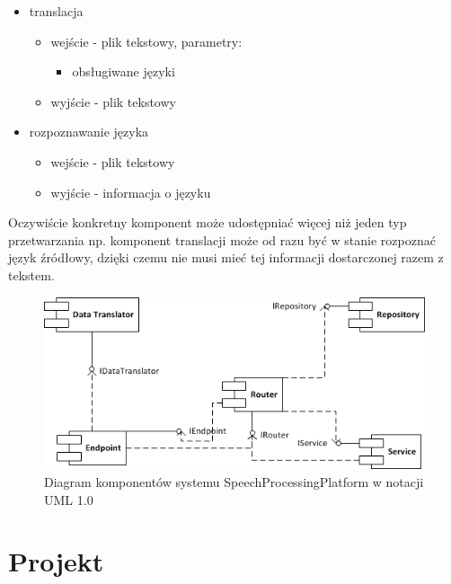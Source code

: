\begin{itemize}
	\item translacja
	\begin{itemize}
		\item wejście - plik tekstowy, parametry:
		\begin{itemize}
			\item obsługiwane języki 
		\end{itemize}
		\item wyjście - plik tekstowy
	\end{itemize}
	\item rozpoznawanie języka
	\begin{itemize}
		\item wejście - plik tekstowy
		\item wyjście - informacja o języku
	\end{itemize}
\end{itemize}

Oczywiście konkretny komponent może udostępniać więcej niż jeden typ przetwarzania np. komponent translacji może od razu być w stanie rozpoznać język źródłowy, dzięki czemu nie musi mieć tej informacji dostarczonej razem z tekstem.

\begin{figure}[!h]
	\centering
	\includegraphics[scale=1.0]{component_uml.png}
	\caption{Diagram komponentów systemu SpeechProcessingPlatform w notacji UML 1.0}\label{fig:component_diagram}
\end{figure}

\section{Projekt}

